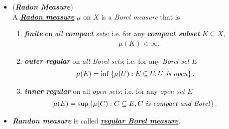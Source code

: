 \documentclass[11pt]{article}
\begin{document}
\begin{itemize}
\item \begin{definition} (\emph{\textbf{Radon Measure}}) \citep{folland2013real} \\
A \underline{\textbf{\emph{Radon measure}}} $\mu$ on $X$ is a \emph{Borel measure} that is 
\begin{enumerate}
\item \emph{\textbf{finite}} on \emph{all \textbf{compact} sets}; i.e. for any \emph{\textbf{compact subset}} $K \subseteq X$, 
\begin{align*}
\mu(K) < \infty.
\end{align*}
\item \emph{\textbf{outer regular}} on \emph{all Borel sets}; i.e. for any \emph{Borel set} $E$ 
\begin{align*}
\mu(E) &= \inf\left\{\mu(U): E \subseteq U, U \text{\emph{ is open}}\right\}.
\end{align*}
\item  \emph{\textbf{inner regular}} on all \emph{open sets}; i.e. for any \emph{open set} $E$
\begin{align*}
\mu(E) &= \sup\left\{\mu(C): C \subseteq E, C \text{\emph{ is compact and Borel}}\right\}.
\end{align*}
\end{enumerate}
\end{definition}

\item \begin{remark}
\emph{\textbf{Randon measure}} is called \underline{\emph{\textbf{regular Borel measure}}}.
\end{remark}
\end{itemize}
\end{document}
